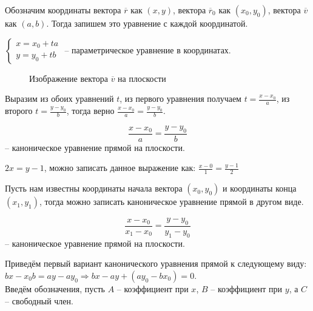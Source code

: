 	Обозначим координаты вектора $\overline{r}$ как $(x, y)$, вектора $\overline{r}_0$ как $(x_0, y_0)$, вектора $\overline{v}$ как $(a, b)$. Тогда запишем это уравнение с каждой координатой.

	\begin{Def}
		$ \begin{cases}
			x = x_0 + ta\\
			y = y_0 + tb
		\end{cases} $ -- параметрическое уравнение в координатах.
	\end{Def}

	\begin{figure}[h]
		\centering
		\def\svgwidth{0.5\columnwidth}
		
		\caption{Изображение вектора $\overline{v}$ на плоскости}
	\end{figure}
	Выразим из обоих уравнений $t$, из первого уравнения получаем $t = \frac{x - x_0}{a}$, из второго $t = \frac{y - y_0}{b}$, тогда верно $\frac{x-x_0}{a} = \frac{y - y_0}{b}$.

	\begin{Def}
		$$\frac{x-x_0}{a} = \frac{y - y_0}{b}$$ -- каноническое уравнение прямой на плоскости.
	\end{Def}

	\begin{Example}
		$2x = y - 1$, можно записать данное выражение как: $\frac{x - 0}{1} = \frac{y - 1}{2}$
	\end{Example}

	Пусть нам известны координаты начала вектора $(x_0, y_0)$ и координаты конца $(x_1, y_1)$, тогда можно записать каноническое уравнение прямой в другом виде.

	\begin{figure}[h]
		\centering
		\def\svgwidth{0.2\columnwidth}
		
	\end{figure}

	\begin{Def}
		$$\frac{x-x_0}{x_1 - x_0} = \frac{y - y_0}{y_1 - y_0}$$ -- каноническое уравнение прямой на плоскости.
	\end{Def}

	Приведём первый вариант канонического уравнения прямой к следующему виду: \\
	$bx - x_0b = ay - ay_0 \Rightarrow bx - ay + (ay_0 -bx_0) = 0$.\\
	Введём обозначения, пусть $A$ -- коэффициент при $x$, $B$ -- коэффициент при $y$, а $C$ -- свободный член.

